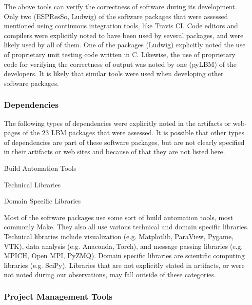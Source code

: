 \documentclass[12pt, notitlepage]{article}
\begin{document}
The above tools can verify the correctness of software during its development. Only two (ESPResSo, Ludwig) of the software packages that were assessed mentioned using continuous integration tools, like Travis CI. Code editors and compilers were explicitly noted to have been used by several packages, and were likely used by all of them. One of the packages (Ludwig) explicitly noted the use of proprietary unit testing code written in C. Likewise, the use of proprietary code for verifying the correctness of output was noted by one (pyLBM) of the developers. It is likely that similar tools were used when developing other software packages. 

\subsubsection{Dependencies}

The following types of dependencies were explicitly noted in the artifacts or web-pages of the 23 LBM packages that were assessed. It is possible that other types of dependencies are part of these software packages, but are not clearly specified in their artifacts or web sites and because of that they are not listed here.

	\begin{multicols}{2}	
		\begin{itemize}
		\end{itemize}
	\end{multicols}


Most of the software packages use some sort of build automation tools, most commonly Make. They also all use various technical and domain specific libraries. Technical libraries include visualization (e.g. Matplotlib, ParaView, Pygame, VTK), data analysis (e.g. Anaconda, Torch), and message passing libraries (e.g. MPICH, Open MPI, PyZMQ). Domain specific libraries are scientific computing libraries (e.g. SciPy). Libraries that are not explicitly stated in artifacts, or were not noted during our observations, may fall outside of these categories. 

\subsubsection{Project Management Tools}
\end{document}
